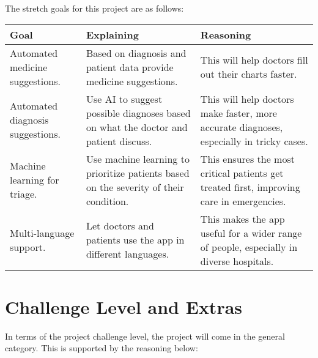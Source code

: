 \documentclass{article}
\begin{document}
The stretch goals for this project are as follows:

\begin{table}[H]
    \centering
    \begin{tabular}{p{4cm} p{4cm} p{4cm}}
        \toprule
        \textbf{Goal} & \textbf{Explaining} & \textbf{Reasoning} \\
        \midrule
        Automated medicine suggestions. & Based on diagnosis and patient data provide medicine suggestions. & This will help doctors fill out their charts faster. \\ %
        \midrule
        Automated diagnosis suggestions.  & Use AI to suggest possible diagnoses based on what the doctor and patient discuss.  & This will help doctors make faster, more accurate diagnoses, especially in tricky cases.\\ 
        \midrule
        Machine learning for triage.  & Use machine learning to prioritize patients based on the severity of their condition. & This ensures the most critical patients get treated first, improving care in emergencies. \\
        \midrule 
        Multi-language support. & Let doctors and patients use the app in different languages.  & This makes the app useful for a wider range of people, especially in diverse hospitals. \\
        \bottomrule
    \end{tabular}
\end{table}

\section{Challenge Level and Extras}


In terms of the project challenge level, the project will come in the general category. This is supported by the reasoning below:
\end{document}
